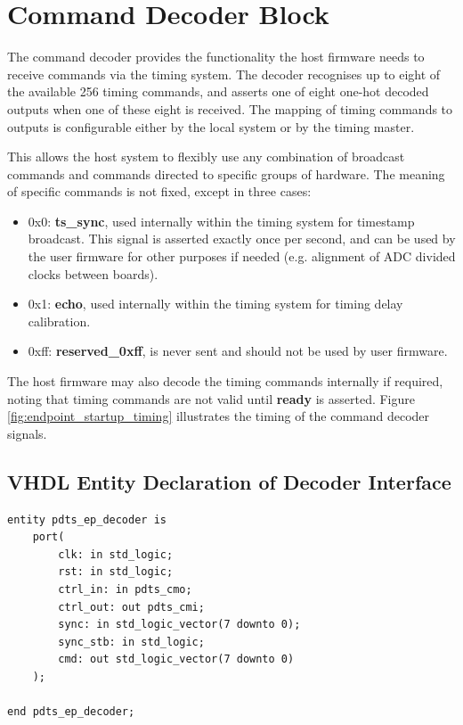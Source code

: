 \documentclass{article}
\begin{document}
\section{Command Decoder Block}

The command decoder provides the functionality the host firmware needs to receive commands via the timing system. The decoder recognises up to eight of the available 256 timing commands, and asserts one of eight one-hot decoded outputs when one of these eight is received. The mapping of timing commands to outputs is configurable either by the local system or by the timing master.

This allows the host system to flexibly use any combination of broadcast commands and commands directed to specific groups of hardware. The meaning of specific commands is not fixed, except in three cases:
\begin{itemize}
\item 0x0: \textbf{ts\_sync}, used internally within the timing system for timestamp broadcast. This signal is asserted exactly once per second, and can be used by the user firmware for other purposes if needed (e.g. alignment of ADC divided clocks between boards).
\item 0x1: \textbf{echo}, used internally within the timing system for timing delay calibration.
\item 0xff: \textbf{reserved\_0xff}, is never sent and should not be used by user firmware.
\end{itemize}
The host firmware may also decode the timing commands internally if required, noting that timing commands are not valid until \textbf{ready} is asserted. Figure \ref{fig:endpoint_startup_timing} illustrates the timing of the command decoder signals.

\subsection{VHDL Entity Declaration of Decoder Interface}

\begin{verbatim}
entity pdts_ep_decoder is
    port(
        clk: in std_logic;
        rst: in std_logic;
        ctrl_in: in pdts_cmo;
        ctrl_out: out pdts_cmi;
        sync: in std_logic_vector(7 downto 0);
        sync_stb: in std_logic;
        cmd: out std_logic_vector(7 downto 0)
    );

end pdts_ep_decoder;
\end{verbatim}
\end{document}
